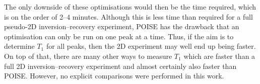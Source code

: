 The only downside of these optimisations would then be the time required, which is on the order of 2--4 minutes.
Although this is less time than required for a full pseudo-2D inversion--recovery experiment, POISE has the drawback that an optimisation can only be run on one peak at a time.
Thus, if the aim is to determine $T_1$ for all peaks, then the 2D experiment may well end up being faster.
On top of that, there are many other ways to measure $T_1$ which are faster than a full 2D inversion--recovery experiment and almost certainly also faster than POISE.\autocite{Christensen1974JPC,Homer1985JMR,Loening2003JMR,Smith2013CPC,Wei2021JOC}
However, no explicit comparisons were performed in this work.
